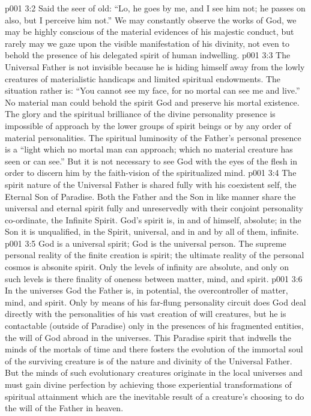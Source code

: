 \vs p001 3:2 Said the seer of old: “Lo, he goes by me, and I see him not; he passes on also, but I perceive him not.” We may constantly observe the works of God, we may be highly conscious of the material evidences of his majestic conduct, but rarely may we gaze upon the visible manifestation of his divinity, not even to behold the presence of his delegated spirit of human indwelling.
\vs p001 3:3 The Universal Father is not invisible because he is hiding himself away from the lowly creatures of materialistic handicaps and limited spiritual endowments. The situation rather is: “You cannot see my face, for no mortal can see me and live.” No material man could behold the spirit God and preserve his mortal existence. The glory and the spiritual brilliance of the divine personality presence is impossible of approach by the lower groups of spirit beings or by any order of material personalities. The spiritual luminosity of the Father’s personal presence is a “light which no mortal man can approach; which no material creature has seen or can see.” But it is not necessary to see God with the eyes of the flesh in order to discern him by the faith\hyp{}vision of the spiritualized mind.
\vs p001 3:4 \pc The spirit nature of the Universal Father is shared fully with his coexistent self, the Eternal Son of Paradise. Both the Father and the Son in like manner share the universal and eternal spirit fully and unreservedly with their conjoint personality co\hyp{}ordinate, the Infinite Spirit. God’s spirit is, in and of himself, absolute; in the Son it is unqualified, in the Spirit, universal, and in and by all of them, infinite.
\vs p001 3:5 \pc God is a universal spirit; God is the universal person. The supreme personal reality of the finite creation is spirit; the ultimate reality of the personal cosmos is absonite spirit. Only the levels of infinity are absolute, and only on such levels is there finality of oneness between matter, mind, and spirit.
\vs p001 3:6 \pc In the universes God the Father is, in potential, the overcontroller of matter, mind, and spirit. Only by means of his far\hyp{}flung personality circuit does God deal directly with the personalities of his vast creation of will creatures, but he is contactable (outside of Paradise) only in the presences of his fragmented entities, the will of God abroad in the universes. This Paradise spirit that indwells the minds of the mortals of time and there fosters the evolution of the immortal soul of the surviving creature is of the nature and divinity of the Universal Father. But the minds of such evolutionary creatures originate in the local universes and must gain divine perfection by achieving those experiential transformations of spiritual attainment which are the inevitable result of a creature’s choosing to do the will of the Father in heaven.

